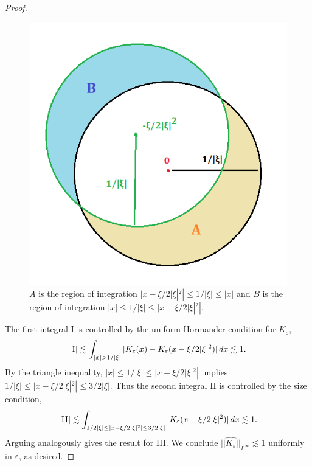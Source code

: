 \documentclass[reqno]{amsart}
\theoremstyle{definition}
\theoremstyle{remark}
\renewcommand{\epsilon}{\varepsilon}
\begin{document}
\begin{proof}
		\begin{figure}[h]
		\begin{center}
			\includegraphics[scale =0.5]{regions}
			\caption{$A$ is the region of integration $|x - \xi/2|\xi|^2| \leq 1/|\xi| \leq |x|$ and $B$ is the region of integration $|x| \leq 1/|\xi| \leq |x - \xi/2|\xi|^2|$.}
		\end{center}	
		\end{figure}	
		
	The first integral \textsc{I} is controlled by the uniform Hormander condition for $K_\epsilon$, 
		\[ |\textsc{I}| \lesssim \int_{|x|> 1/|\xi|} |K_\epsilon (x) - K_\epsilon (x - \xi/2|\xi|^2)| \, dx \lesssim 1.  \]
	By the triangle inequality, $|x| \leq 1/|\xi| \leq |x - \xi/2|\xi|^2|$ implies $1/|\xi| \leq |x - \xi/2|\xi|^2| \leq 3/2|\xi|$. Thus the second integral \textsc{II} is controlled by the size condition, 
		\[ |\textsc{II}| \lesssim \int_{1/2|\xi| \leq |x - \xi/2|\xi|^2| \leq 3/2|\xi|} |K_\epsilon (x - \xi/2|\xi|^2)| \, dx \lesssim 1. \]
	Arguing analogously gives the result for \textsc{III}. We conclude $||\widehat{K_\epsilon}||_{L^\infty} \lesssim 1$ uniformly in $\epsilon$, as desired. 		
\end{proof}
\end{document}
